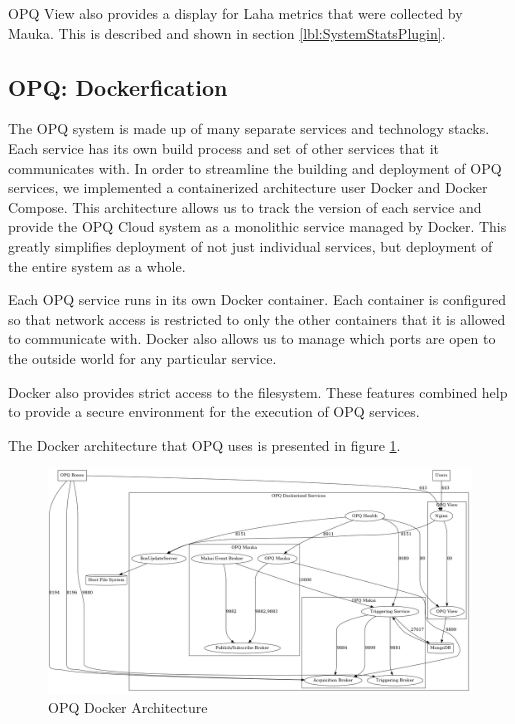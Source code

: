 OPQ View also provides a display for Laha metrics that were collected by Mauka. This is described and shown in section \ref{lbl:SystemStatsPlugin}.

\subsection{OPQ: Dockerfication}
The OPQ system is made up of many separate services and technology stacks. Each service has its own build process and set of other services that it communicates with. In order to streamline the building and deployment of OPQ services, we implemented a containerized architecture user Docker and Docker Compose. This architecture allows us to track the version of each service and provide the OPQ Cloud system as a monolithic service managed by Docker. This greatly simplifies deployment of not just individual services, but deployment of the entire system as a whole.

Each OPQ service runs in its own Docker container. Each container is configured so that network access is restricted to only the other containers that it is allowed to communicate with. Docker also allows us to manage which ports are open to the outside world for any particular service.

Docker also provides strict access to the filesystem. These features combined help to provide a secure environment for the execution of OPQ services.

The Docker architecture that OPQ uses is presented in figure \ref{fig:docker_deploy}.

\begin{figure}
	\centering
	\includegraphics[width=1\linewidth]{figures/docker_deploy.png}
	\caption{OPQ Docker Architecture}\label{fig:docker_deploy}
\end{figure}

